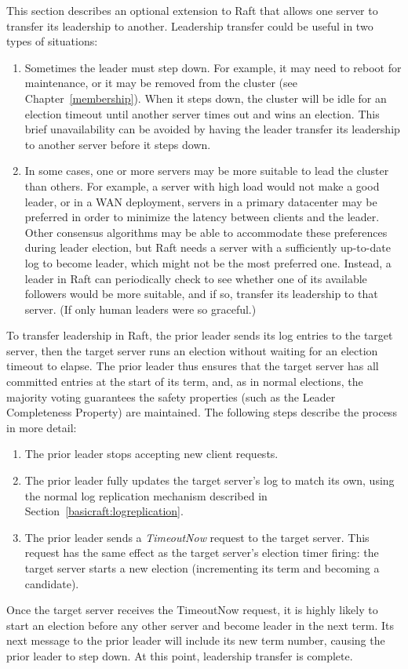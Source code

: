 This section describes an optional extension to Raft that allows one
server to transfer its leadership to another. Leadership transfer could
be useful in two types of situations:
%
\begin{enumerate}
%
\item Sometimes the leader must step down. For example, it may
need to reboot for maintenance, or it may be removed from the cluster
(see Chapter~\ref{membership}). When it steps down, the cluster will be
idle for an election timeout until another server times out and wins an
election. This brief unavailability can be avoided by having the leader
transfer its leadership to another server before it steps down.
%
\item In some cases, one or more servers may be more suitable to lead
the cluster than others. For example, a server with high load would not
make a good leader, or in a WAN deployment, servers in a primary
datacenter may be preferred in order to minimize the latency between
clients and the leader. Other consensus algorithms may be able
to accommodate these preferences during leader election, but Raft needs
a server with a sufficiently up-to-date log to become leader, which
might not be the most preferred one. Instead, a leader in Raft
can periodically check to see whether one of its available followers
would be more suitable, and if so, transfer its leadership to that
server. (If only human leaders were so graceful.)
%
\end{enumerate}

To transfer leadership in Raft, the prior leader sends its log entries to
the target server, then the target server runs an election without
waiting for an election timeout to elapse.
The prior leader thus ensures that the target server has all committed
entries at the start of its term, and, as in normal elections, the
majority voting guarantees the safety properties (such as the Leader
Completeness Property) are maintained. The following steps describe the
process in more detail:
%
\begin{enumerate}
%
\item The prior leader stops accepting new client requests.
%
\item The prior leader fully updates the target server's log to match
its own, using the normal log replication mechanism described in
Section~\ref{basicraft:logreplication}.
%
\item The prior leader sends a \emph{TimeoutNow} request to the target
server. This request has the same effect as the target server's election
timer firing: the target server starts a new election (incrementing its
term and becoming a candidate).
%
\end{enumerate}
%
Once the target server receives the TimeoutNow request, it is highly
likely to start an election before any other server and become leader in
the next term. Its next message to the prior leader will include its new
term number, causing the prior leader to step down. At this point,
leadership transfer is complete.

